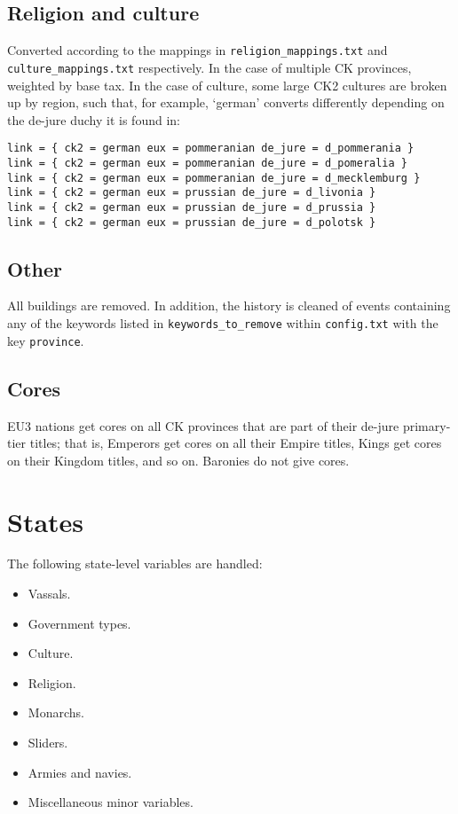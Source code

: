 \documentclass[12pt,ebook,oneside]{book}
\begin{document}
\section{Religion and culture}

\label{sec:provculture}

Converted according to the mappings in \verb|religion_mappings.txt|
and \verb|culture_mappings.txt| respectively. In the case of multiple
CK provinces, weighted by base tax. In the case of culture, some large
CK2 cultures are broken up by region, such that, for example, `german'
converts differently depending on the de-jure duchy it is found in:
\begin{verbatim}
link = { ck2 = german eux = pommeranian de_jure = d_pommerania }
link = { ck2 = german eux = pommeranian de_jure = d_pomeralia }
link = { ck2 = german eux = pommeranian de_jure = d_mecklemburg }
link = { ck2 = german eux = prussian de_jure = d_livonia }
link = { ck2 = german eux = prussian de_jure = d_prussia }
link = { ck2 = german eux = prussian de_jure = d_polotsk }
\end{verbatim} 

\section{Other}

All buildings are removed. In addition, the history is cleaned of
events containing any of the keywords listed in
\verb|keywords_to_remove|
within \verb|config.txt| with the key \verb|province|. 

\section{Cores}

EU3 nations get cores on all CK provinces that are part of their
de-jure primary-tier titles; that is, Emperors get cores on all their
Empire titles, Kings get cores on their Kingdom titles, and so
on. Baronies do not give cores. 

\chapter{States}

The following state-level variables are handled:
\begin{itemize}
\item Vassals.
\item Government types. 
\item Culture. 
\item Religion. 
\item Monarchs. 
\item Sliders.
\item Armies and navies. 
\item Miscellaneous minor variables. 
\end{itemize}
\end{document}

